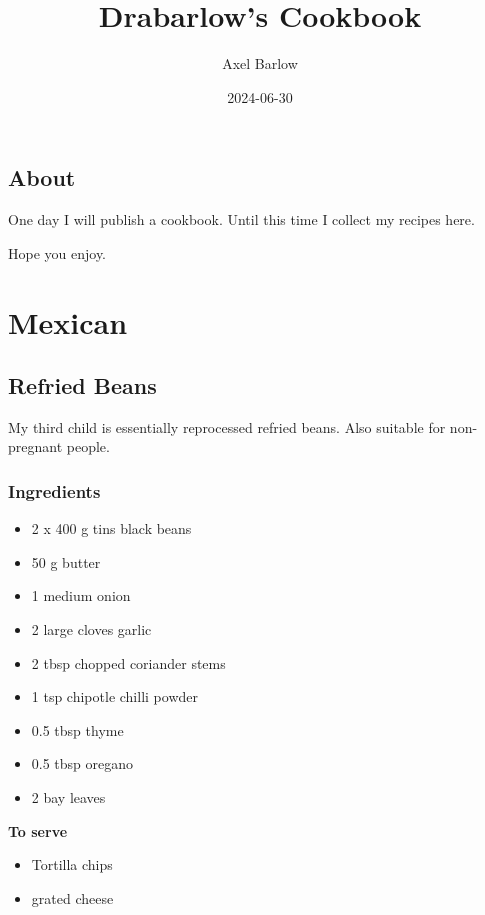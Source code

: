 \documentclass[
]{book}
\title{Drabarlow's Cookbook}
\author{Axel Barlow}
\date{2024-06-30}
\providecommand{\tightlist}{%
  \setlength{\itemsep}{0pt}\setlength{\parskip}{0pt}}
\begin{document}
\maketitle

{
\setcounter{tocdepth}{1}
\tableofcontents
}
\hypertarget{about}{%
\chapter*{About}\label{about}}

One day I will publish a cookbook. Until this time I collect my recipes here.

Hope you enjoy.

\hypertarget{part-mexican}{%
\part{Mexican}\label{part-mexican}}

\hypertarget{refried-beans}{%
\chapter{Refried Beans}\label{refried-beans}}

My third child is essentially reprocessed refried beans. Also suitable for non-pregnant people.

\hypertarget{ingredients}{%
\section{Ingredients}\label{ingredients}}

\begin{itemize}
\tightlist
\item
  2 x 400 g tins black beans
\item
  50 g butter
\item
  1 medium onion
\item
  2 large cloves garlic
\item
  2 tbsp chopped coriander stems
\item
  1 tsp chipotle chilli powder
\item
  0.5 tbsp thyme
\item
  0.5 tbsp oregano
\item
  2 bay leaves
\end{itemize}

\textbf{To serve}

\begin{itemize}
\tightlist
\item
  Tortilla chips
\item
  grated cheese
\end{itemize}
\end{document}
